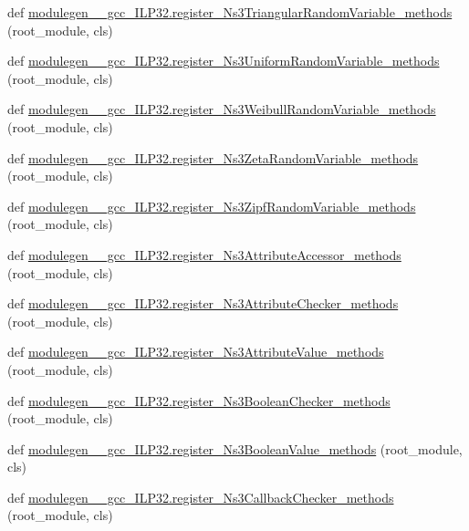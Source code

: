 \begin{DoxyCompactItemize}
\item 
def \hyperlink{namespacemodulegen____gcc__ILP32_a56825f84f5a3f31c90087d3a4c1d8c0b}{modulegen\+\_\+\+\_\+gcc\+\_\+\+I\+L\+P32.\+register\+\_\+\+Ns3\+Triangular\+Random\+Variable\+\_\+methods} (root\+\_\+module, cls)
\item 
def \hyperlink{namespacemodulegen____gcc__ILP32_a5465d181d936c13f0d7dd97daae33da0}{modulegen\+\_\+\+\_\+gcc\+\_\+\+I\+L\+P32.\+register\+\_\+\+Ns3\+Uniform\+Random\+Variable\+\_\+methods} (root\+\_\+module, cls)
\item 
def \hyperlink{namespacemodulegen____gcc__ILP32_a1b7e953b4fcdede15ddee8f372636aeb}{modulegen\+\_\+\+\_\+gcc\+\_\+\+I\+L\+P32.\+register\+\_\+\+Ns3\+Weibull\+Random\+Variable\+\_\+methods} (root\+\_\+module, cls)
\item 
def \hyperlink{namespacemodulegen____gcc__ILP32_aa274e4bd8d5ca034ca1600f4e3837763}{modulegen\+\_\+\+\_\+gcc\+\_\+\+I\+L\+P32.\+register\+\_\+\+Ns3\+Zeta\+Random\+Variable\+\_\+methods} (root\+\_\+module, cls)
\item 
def \hyperlink{namespacemodulegen____gcc__ILP32_ac5e1d46fed6d871a113192dad04bec07}{modulegen\+\_\+\+\_\+gcc\+\_\+\+I\+L\+P32.\+register\+\_\+\+Ns3\+Zipf\+Random\+Variable\+\_\+methods} (root\+\_\+module, cls)
\item 
def \hyperlink{namespacemodulegen____gcc__ILP32_a8f1258b8ab8ec43af174fc3ff9198eb6}{modulegen\+\_\+\+\_\+gcc\+\_\+\+I\+L\+P32.\+register\+\_\+\+Ns3\+Attribute\+Accessor\+\_\+methods} (root\+\_\+module, cls)
\item 
def \hyperlink{namespacemodulegen____gcc__ILP32_a891dd82b08e1260e01670cf52c90138c}{modulegen\+\_\+\+\_\+gcc\+\_\+\+I\+L\+P32.\+register\+\_\+\+Ns3\+Attribute\+Checker\+\_\+methods} (root\+\_\+module, cls)
\item 
def \hyperlink{namespacemodulegen____gcc__ILP32_a7475be8fb4d2d4611c513f6d21c50a32}{modulegen\+\_\+\+\_\+gcc\+\_\+\+I\+L\+P32.\+register\+\_\+\+Ns3\+Attribute\+Value\+\_\+methods} (root\+\_\+module, cls)
\item 
def \hyperlink{namespacemodulegen____gcc__ILP32_ab414168a02828985c68a8c86579fc903}{modulegen\+\_\+\+\_\+gcc\+\_\+\+I\+L\+P32.\+register\+\_\+\+Ns3\+Boolean\+Checker\+\_\+methods} (root\+\_\+module, cls)
\item 
def \hyperlink{namespacemodulegen____gcc__ILP32_a6621c83b18c9ae966428ec3c08728331}{modulegen\+\_\+\+\_\+gcc\+\_\+\+I\+L\+P32.\+register\+\_\+\+Ns3\+Boolean\+Value\+\_\+methods} (root\+\_\+module, cls)
\item 
def \hyperlink{namespacemodulegen____gcc__ILP32_acf2267ead3a407631a6fe495c0560d6b}{modulegen\+\_\+\+\_\+gcc\+\_\+\+I\+L\+P32.\+register\+\_\+\+Ns3\+Callback\+Checker\+\_\+methods} (root\+\_\+module, cls)

\end{DoxyCompactItemize}

